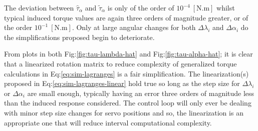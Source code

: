 \par
The deviation between $\hat{\tau}_\alpha$ and $\tilde{\tau}_\alpha$ is only of the order of $10^{-4}~[\text{N.m}]$ whilst typical induced torque values are again three orders of magnitude greater, or of the order $10^{-1}~[\text{N.m}]$. Only at large angular changes for both $\Delta\lambda_i$ and $\Delta\alpha_i$ do the simplifications proposed begin to deteriorate.
\par
From plots in both Fig:\ref{fig:tau-lambda-hat} and Fig:\ref{fig:tau-alpha-hat}; it is clear that a linearized rotation matrix to reduce complexity of generalized torque calculations in Eq:\ref{eq:sim-lagranges} is a fair simplification. The linearization(s) proposed in Eq:\ref{eq:sim-lagranges-linear} hold true so long as the step size for $\Delta\lambda_i$ or $\Delta\alpha_i$ are small enough, typically having an error three orders of magnitude less than the induced response considered. The control loop will only ever be dealing with minor step size changes for servo positions and so, the linearization is an appropriate one that will reduce interval computational complexity.

